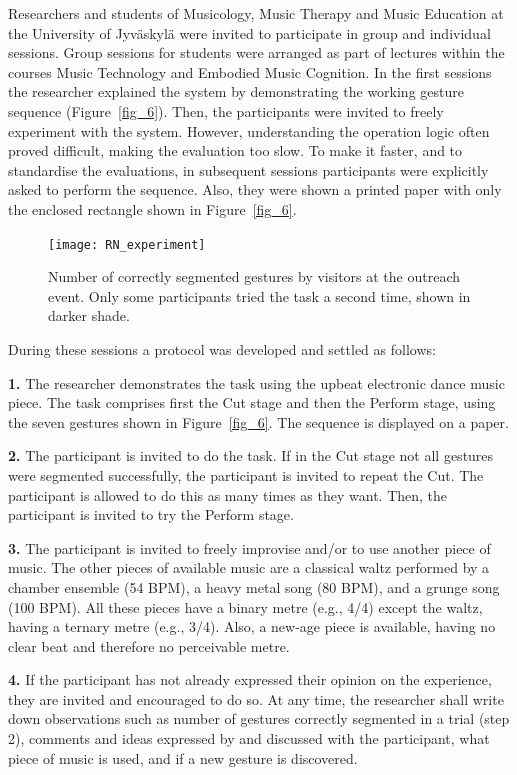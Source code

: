\documentclass{nime-alternate_MANUSCRIPT} %
\begin{document}
Researchers and students of Musicology, Music Therapy and Music Education at the 
University of Jyväskylä
were invited to participate in group and individual sessions. Group sessions for students were arranged as part of lectures within the courses Music Technology and Embodied Music Cognition. In the first sessions the researcher explained the system by demonstrating the working gesture sequence (Figure~\ref{fig_6}). Then, the participants were invited to freely experiment with the system. However, understanding the operation logic often proved difficult, making the evaluation too slow. To make it faster, and to standardise the evaluations, in subsequent sessions participants were explicitly asked to perform the sequence. Also, they were shown a printed paper with only the enclosed rectangle shown in Figure~\ref{fig_6}. 

\begin{figure}[t!]
	\centering
		\texttt{[image: RN\_experiment]}
	\caption{Number of correctly segmented gestures by visitors at the outreach event. Only some participants tried the task a second time, shown in darker shade.}
	\label{fig_7}
\end{figure}

During these sessions a protocol was developed and settled as follows:

\textbf{1.}	The researcher demonstrates the task using the upbeat electronic dance music piece. The task comprises first the Cut stage and then the Perform stage, using the seven gestures shown in Figure~\ref{fig_6}. The sequence is displayed on a paper.

\textbf{2.}	The participant is invited to do the task. If in the Cut stage not all gestures were segmented successfully, the participant is invited to repeat the Cut. The participant is allowed to do this as many times as they want. Then, the participant is invited to try the Perform stage.

\textbf{3.}	The participant is invited to freely improvise and/or to use another piece of music. The other pieces of available music are a classical waltz performed by a chamber ensemble (54 BPM), a heavy metal song (80 BPM), and a grunge song (100 BPM). All these pieces have a binary metre (e.g., 4/4) except the waltz, having a ternary metre (e.g., 3/4). Also, a new-age piece is available, having no clear beat and therefore no perceivable metre. 

\textbf{4.}	If the participant has not already expressed their opinion on the experience, they are invited and encouraged to do so. At any time, the researcher shall write down observations such as number of gestures correctly segmented in a trial (step 2), comments and ideas expressed by and discussed with the participant, what piece of music is used, and if a new gesture is discovered.
\end{document}
